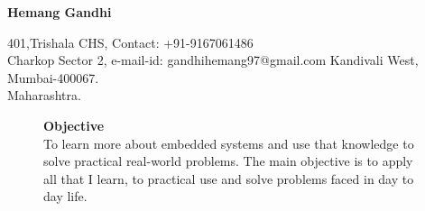 \documentclass{article}
\begin{document}
	
	\begin{center}
		{
			\Large\textbf{Hemang Gandhi}
		}
		
	\end{center}
	
	\begin{flushleft}
		401,Trishala CHS, 		\hspace{2.8in}    		    Contact: +91-9167061486            \\
		Charkop Sector 2, 		\hspace{2.85in}		    e-mail-id: gandhihemang97@gmail.com \hspace{2.8in}
		Kandivali West, \\
		Mumbai-400067.     \\
		Maharashtra.\\
		
	\end{flushleft}
	\vspace{-0.3in}
	\begin{figure}[h]
		{%
		\hspace{4.4in}
\setlength{\fboxsep}{2.5pt}%
\setlength{\fboxrule}{1pt}%
%
}%
		\begin{flushleft}
\textrm{\textbf{Objective}}\\
\textrm{To learn more about embedded systems and use that knowledge to solve practical real-world problems. The main objective is to apply all that I learn, to practical use and solve problems faced in day to day life.}
\end{flushleft}
	\end{figure}
	
\end{document}
